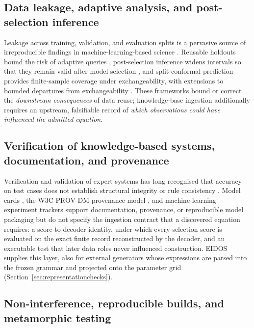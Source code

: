 \subsection{Data leakage, adaptive analysis, and post-selection inference}

Leakage across training, validation, and evaluation splits is a pervasive source of irreproducible findings in machine-learning-based science \citep{kapoor2023leakage}. Reusable holdouts bound the risk of adaptive queries \citep{dwork2015holdout}, post-selection inference widens intervals so that they remain valid after model selection \citep{berk2013postselection}, and split-conformal prediction provides finite-sample coverage under exchangeability, with extensions to bounded departures from exchangeability \citep{lei2018conformal,barber2023exchangeability}. These frameworks bound or correct the \emph{downstream consequences} of data reuse; knowledge-base ingestion additionally requires an upstream, falsifiable record of \emph{which observations could have influenced the admitted equation}.

\subsection{Verification of knowledge-based systems, documentation, and provenance}

Verification and validation of expert systems has long recognised that accuracy on test cases does not establish structural integrity or rule consistency \citep{okeefe1993vv}. Model cards \citep{mitchell2019modelcards}, the W3C PROV-DM provenance model \citep{moreau2013provdm}, and machine-learning experiment trackers support documentation, provenance, or reproducible model packaging but do not specify the ingestion contract that a discovered equation requires: a score-to-decoder identity, under which every selection score is evaluated on the exact finite record reconstructed by the decoder, and an executable test that later data roles never influenced construction. EIDOS supplies this layer, also for external generators whose expressions are parsed into the frozen grammar and projected onto the parameter grid (Section~\ref{sec:representationchecks}).

\subsection{Non-interference, reproducible builds, and metamorphic testing}\label{sec:paradigms}

